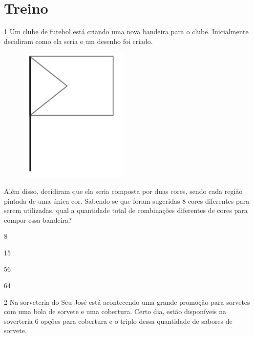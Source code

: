 \pagebreak
\section{Treino}

\num{1} Um clube de futebol está criando uma nova bandeira para o clube.
Inicialmente decidiram como ela seria e um desenho foi criado.

\begin{figure}[htpb!]
\centering
\includegraphics[width=.35\textwidth]{./imgs/mat16.png}
\end{figure}

Além disso, decidiram que ela seria composta por duas cores, sendo cada
região pintada de uma única cor. Sabendo-se que foram sugeridas 8 cores
diferentes para serem utilizadas, qual a quantidade total de combinações
diferentes de cores para compor essa bandeira?

\begin{minipage}{.5\textwidth}
\begin{escolha}
\item
  8
\item
  15
\item
  56
\item
  64
\end{escolha}
\end{minipage}


\num{2} Na sorveteria do Seu José está acontecendo uma grande promoção
para sorvetes com uma bola de sorvete e uma cobertura. Certo dia, estão disponíveis na soverteria 6 opções para cobertura e o triplo dessa quantidade de sabores de sorvete.

